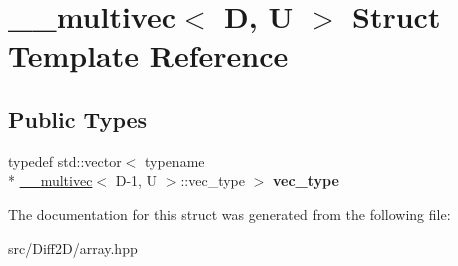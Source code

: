 \hypertarget{struct____multivec}{\section{\-\_\-\-\_\-multivec$<$ D, U $>$ Struct Template Reference}
\label{struct____multivec}
}
\subsection*{Public Types}
\begin{DoxyCompactItemize}
\item 
\hypertarget{struct____multivec_a9937ea3f66220e5a8df1af8a1afac678}{typedef std\-::vector$<$ typename \\*
\hyperlink{struct____multivec}{\-\_\-\-\_\-multivec}$<$ D-\/1, U $>$\-::vec\-\_\-type $>$ {\bfseries vec\-\_\-type}}\label{struct____multivec_a9937ea3f66220e5a8df1af8a1afac678}

\end{DoxyCompactItemize}


The documentation for this struct was generated from the following file\-:\begin{DoxyCompactItemize}
\item 
src/\-Diff2\-D/array.\-hpp\end{DoxyCompactItemize}
